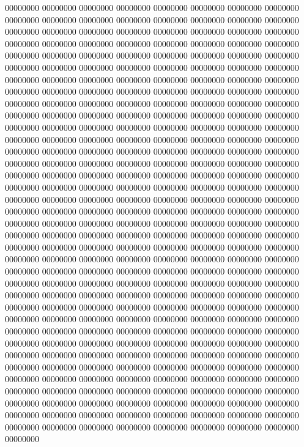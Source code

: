 00000000
00000000
00000000
00000000
00000000
00000000
00000000
00000000
00000000
00000000
00000000
00000000
00000000
00000000
00000000
00000000
00000000
00000000
00000000
00000000
00000000
00000000
00000000
00000000
00000000
00000000
00000000
00000000
00000000
00000000
00000000
00000000
00000000
00000000
00000000
00000000
00000000
00000000
00000000
00000000
00000000
00000000
00000000
00000000
00000000
00000000
00000000
00000000
00000000
00000000
00000000
00000000
00000000
00000000
00000000
00000000
00000000
00000000
00000000
00000000
00000000
00000000
00000000
00000000
00000000
00000000
00000000
00000000
00000000
00000000
00000000
00000000
00000000
00000000
00000000
00000000
00000000
00000000
00000000
00000000
00000000
00000000
00000000
00000000
00000000
00000000
00000000
00000000
00000000
00000000
00000000
00000000
00000000
00000000
00000000
00000000
00000000
00000000
00000000
00000000
00000000
00000000
00000000
00000000
00000000
00000000
00000000
00000000
00000000
00000000
00000000
00000000
00000000
00000000
00000000
00000000
00000000
00000000
00000000
00000000
00000000
00000000
00000000
00000000
00000000
00000000
00000000
00000000
00000000
00000000
00000000
00000000
00000000
00000000
00000000
00000000
00000000
00000000
00000000
00000000
00000000
00000000
00000000
00000000
00000000
00000000
00000000
00000000
00000000
00000000
00000000
00000000
00000000
00000000
00000000
00000000
00000000
00000000
00000000
00000000
00000000
00000000
00000000
00000000
00000000
00000000
00000000
00000000
00000000
00000000
00000000
00000000
00000000
00000000
00000000
00000000
00000000
00000000
00000000
00000000
00000000
00000000
00000000
00000000
00000000
00000000
00000000
00000000
00000000
00000000
00000000
00000000
00000000
00000000
00000000
00000000
00000000
00000000
00000000
00000000
00000000
00000000
00000000
00000000
00000000
00000000
00000000
00000000
00000000
00000000
00000000
00000000
00000000
00000000
00000000
00000000
00000000
00000000
00000000
00000000
00000000
00000000
00000000
00000000
00000000
00000000
00000000
00000000
00000000
00000000
00000000
00000000
00000000
00000000
00000000
00000000
00000000
00000000
00000000
00000000
00000000
00000000
00000000
00000000
00000000
00000000
00000000
00000000
00000000
00000000
00000000
00000000
00000000
00000000
00000000
00000000
00000000
00000000
00000000
00000000
00000000
00000000
00000000
00000000
00000000
00000000
00000000
00000000
00000000
00000000
00000000
00000000
00000000
00000000
00000000
00000000
00000000
00000000
00000000
00000000
00000000
00000000
00000000
00000000
00000000
00000000
00000000
00000000
00000000
